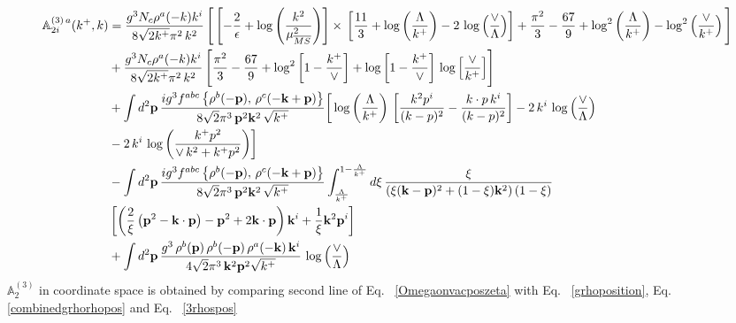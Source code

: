 \documentclass[aps,prd,amsmath,amssymb,nofootinbib]{revtex4-2}
\def\mf#1{\mathbb{#1}}
\numberwithin{equation}{section}
\begin{document}
\begin{align}
     \mf{A}^{(3)\, a}_{2i}(k^{+},k) & = \frac{g^{3}N_{c}\rho^{a}(-k)k^{i}}{8\sqrt{2k^{+}}\pi^{2}\,k^{2}}\,\Bigg[\left[-\frac{2}{\epsilon}+\log{\left(\frac{k^{2}}{\mu^{2}_{\overline{MS}}}\right)}\right]\times\, \left[\frac{11}{3}+\log{\left(\frac{\Lambda}{k^{+}}\right)}-2\,\log{\left(\frac{\vee}{\Lambda}\right)}\right] + \frac{\pi^{2}}{3} - \frac{67}{9} +\log^{2}\left(\frac{\Lambda}{k^{+}}\right)-\log^{2}\left(\frac{\vee}{k^{+}}\right)\Bigg]\notag \\ & +\frac{g^{3}N_{c}\rho^{a}(-k)k^{i}}{8\sqrt{2k^{+}}\pi^{2}\,k^{2}}\, \Bigg[\frac{\pi^{2}}{3} - \frac{67}{9} + \log^{2}{\left[1-\frac{k^{+}}{\vee}\right]}+\log{\left[1-\frac{k^{+}}{\vee}\right]}\,\log{\left[\frac{\vee}{k^{+}}\right]}\Bigg]\notag \\ & +\int d^{2}\mathbf{p}\,\frac{ig^{3}f^{abc}\left\{ \rho^{b}(-\mathbf{p}),\,\rho^{c}(-\mathbf{k}+\mathbf{p})\right\}}{8\sqrt{2}\pi^{3}\,\mathbf{p}^{2}\mathbf{k}^{2}\,\sqrt{k^{+}}}\bigg[\log{\left(\frac{\Lambda}{k^{+}}\right)}\,\left[\frac{k^{2}p^{i}}{(k-p)^{2}}-\frac{k\cdot p\,k^{i}}{(k-p)^{2}}\right] -2\,k^{i}\,\log{\left(\frac{\vee}{\Lambda}\right)}\notag \\ &  -2\,k^{i}\,\log{\left(\frac{k^{+}p^{2}}{\vee\, k^{2}+k^{+}p^{2}}\right)}\bigg]\notag \\ &   - \int d^{2}\mathbf{p}\,\frac{ig^{3}f^{abc}\left\{ \rho^{b}(-\mathbf{p}),\,\rho^{c}(-\mathbf{k}+\mathbf{p})\right\}}{8\sqrt{2}\pi^{3}\,\mathbf{p}^{2}\mathbf{k}^{2}\,\sqrt{k^{+}}}\int_{\frac{\Lambda}{k^{+}}}^{1-\frac{\Lambda}{k^{+}}}d\xi\,\frac{\xi}{\left(\xi(\mathbf{k}-\mathbf{p})^{2}+(1-\xi)\mathbf{k}^{2}\right)(1-\xi)}\notag \\ & \left[\left(\frac{2}{\xi}\left(\mathbf{p}^{2}-\mathbf{k}\cdot\mathbf{p}\right)-\mathbf{p}^{2}+2\mathbf{k}\cdot\mathbf{p}\right)\mathbf{k}^{i} +\frac{1}{\xi}\mathbf{k}^{2}\mathbf{p}^{i}\right] \notag \\ & +\int d^{2}\mathbf{p}\,\frac{g^{3}\,\rho^{b}(\mathbf{p})\,\rho^{b}(-\mathbf{p})\,\rho^{a}(-\mathbf{k})\, \mathbf{k}^{i}}{4\sqrt{2}\pi^{3}\,\mathbf{k}^{2}\mathbf{p}^{2}\sqrt{k^{+}}}\,\log{\left(\frac{\vee}{\Lambda}\right)} 
\end{align}
$ \mf{A}^{(3)}_{2}$ in coordinate space is obtained by comparing second line of Eq.~ \eqref{Omegaonvacposzeta} with Eq.~ \eqref{grhoposition}, Eq.~ \eqref{combinedgrhorhopos} and Eq.~ \eqref{3rhospos}
\end{document}
